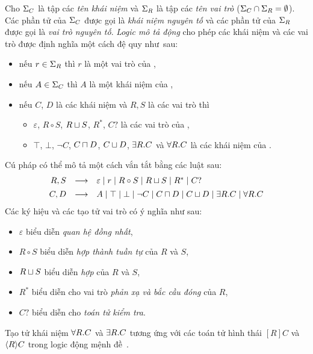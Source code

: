 \begin{Definition}
\label{def:ALCRegSyntax}
Cho $\Sigma_C$ là tập các {\em tên khái niệm} và $\Sigma_R$ là tập các {\em tên vai trò} ($\Sigma_C \cap \Sigma_R = \emptyset$). Các phần tử của $\Sigma_C$ được gọi là {\em khái niệm nguyên tố} và các phần tử của $\Sigma_R$ được gọi là {\em vai trò nguyên tố}. {\em Logic mô tả động} \ALCreg cho phép các khái niệm và các vai trò được định nghĩa một cách đệ quy như~sau:
\begin{itemize}
	\item nếu $r \in \Sigma_R$ thì $r$ là một vai trò của \ALCreg,
	\item nếu $A \in \Sigma_C$ thì $A$ là một khái niệm của \ALCreg,
	\item nếu $C$, $D$ là các khái niệm và $R, S$ là các vai trò thì 
	\begin{itemize}
		\item $\varepsilon$, $R \circ S$, $R \sqcup S$, $R^*$, $C?$ là các vai trò của \ALCreg,
		\item $\top$, $\bot$, $\neg C$, $C \sqcap D$, $C \sqcup D$, $\exists R.C$ và $\forall R.C$ là các khái niệm của \ALCreg.\myend
	\end{itemize}
\end{itemize}
\end{Definition}
%
\noindent
Cú pháp \ALCreg có thể mô tả một cách vắn tắt bằng các luật sau:
\[
	\begin{array}{r c l}
		R, S & \longrightarrow &
		\varepsilon \mid
		r \mid 
		R \circ S \mid
		R \mor S \mid
		R^* \mid
		C?\\[1ex]
%
		C, D & \longrightarrow &
		A \mid 
		\top \mid 
		\bot \mid 
		\neg C \mid 
		C \mand D \mid 
		C \mor D \mid 
		\E R.C \mid
		\V R.C
	\end{array}
\]
%
Các ký hiệu và các tạo tử vai trò có ý nghĩa như sau:
\begin{itemize}
	\item $\varepsilon$ biểu diễn {\em quan hệ đồng nhất},
	\item $R \circ S$ biểu diễn {\em hợp thành tuần tự} của $R$ và $S$,
	\item $R \sqcup S$ biểu diễn {\em hợp} của $R$ và $S$,
	\item $R^*$ biểu diễn cho vai trò {\em phản xạ và bắc cầu đóng} của $R$,
	\item $C?$ biểu diễn cho {\em toán tử kiểm tra}.
\end{itemize}

Tạo tử khái niệm $\forall R.C$ và $\exists R.C$ tương ứng với các toán tử hình thái $[R]C$ và $\left\langle R\right\rangle\!C$ trong logic động mệnh đề~\cite{Nguyen2013}.


